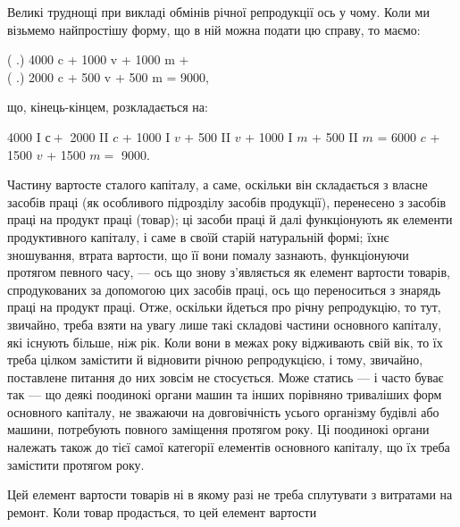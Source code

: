 Великі труднощі при викладі обмінів річної репродукції ось у чому.
Коли ми візьмемо найпростішу форму, що в ній можна подати цю
справу, то маємо:
\begin{center}

  ( .) 4000 c + 1000 v + 1000 m +\\

  ( .) 2000 c + 500 v + 500 m = 9000,

\end{center}
що, кінець-кінцем, розкладається на:
\begin{center}
  4000 I $с +$ 2000 II $c$ + 1000 I $v$ + 500 II $v$ + 1000 I $m$ + 500 II $m$ =
  6000 $c$ + 1500 $v$ + 1500 $m =$ 9000.
\end{center}
Частину вартосте сталого капіталу, а саме, оскільки він складається
з власне засобів праці (як особливого підрозділу засобів продукції),
перенесено з засобів праці на продукт праці (товар); ці засоби праці
й далі функціонують як елементи продуктивного капіталу, і саме в своїй
старій натуральній формі; їхнє зношування, втрата вартости, що її вони
помалу зазнають, функціонуючи протягом певного часу, — ось що знову
з’являється як елемент вартости товарів, спродукованих за допомогою цих
засобів праці, ось що переноситься з знарядь праці на продукт праці. Отже,
оскільки йдеться про річну репродукцію, то тут, звичайно, треба взяти
на увагу лише такі складові частини основного капіталу, які існують
більше, ніж рік. Коли вони в межах року відживають свій вік, то їх
треба цілком замістити й відновити річною репродукцією, і тому, звичайно,
поставлене питання до них зовсім не стосується. Може статись —
і часто буває так — що деякі поодинокі органи машин та інших порівняно
триваліших форм основного капіталу, не зважаючи на довговічність
усього організму будівлі або машини, потребують повного заміщення
протягом року. Ці поодинокі органи належать також до тієї самої категорії
елементів основного капіталу, що їх треба замістити протягом року.

Цей елемент вартости товарів ні в якому разі не треба сплутувати з
витратами на ремонт. Коли товар продасться, то цей елемент вартости
\parbreak{}  %
